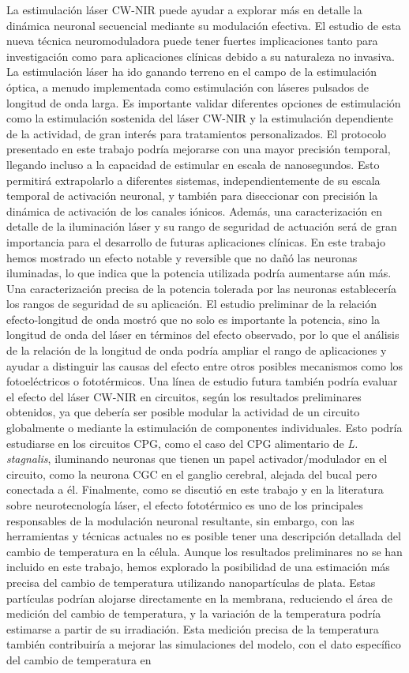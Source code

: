 La estimulación láser CW-NIR puede ayudar a explorar más en detalle la dinámica neuronal secuencial me\-diante su modulación efectiva. El estudio de esta nueva técnica neuromoduladora puede tener fuertes implicaciones tanto para investigación como para aplicaciones clínicas debido a su naturaleza no invasiva. La estimulación láser ha ido ganando terreno en el campo de la estimulación óptica, a menudo implementada como estimulación con láseres pulsados de longitud de onda larga. Es importante validar diferentes opciones de estimulación como la estimulación sostenida del láser CW-NIR y la esti\-mulación dependiente de la actividad, de gran interés para tratamientos personalizados. El protocolo presentado en este trabajo podría mejorarse con una mayor precisión temporal, llegando incluso a la capacidad de estimular en escala de nanosegundos. Esto permitirá extrapolarlo a dife\-rentes sistemas, independientemente de su escala temporal de activación neuronal, y también para di\-seccionar con precisión la dinámica de activación de los canales iónicos. Además, una caracterización en detalle de la iluminación láser y su rango de seguridad de actuación será de gran importancia para el desarrollo de futuras aplicaciones clínicas. En este trabajo hemos mostrado un efecto notable y reversible que no dañó las neuronas iluminadas, lo que indica que la potencia utilizada podría aumentarse aún más. Una caracterización precisa de la potencia tolerada por las neuronas establecería los rangos de seguridad de su aplicación. El estudio preliminar de la relación efecto-longitud de onda mostró que no solo es importante la potencia, sino la longitud de onda del láser en términos del efecto observado, por lo que el análisis de la relación de la longitud de onda podría ampliar el rango de aplicaciones y ayudar a distinguir las causas del efecto entre otros posibles mecanismos como los fotoeléctricos o fototérmicos. Una línea de estudio futura también podría evaluar el efecto del láser CW-NIR en circuitos, según los resultados preliminares obtenidos, ya que debería ser posible modular la actividad de un circuito globalmente o mediante la estimulación de componentes indivi\-duales. Esto podría estudiarse en los circuitos  CPG, como el caso del CPG alimentario de \textit{L. stagnalis}, iluminando neuronas que tienen un papel activador/modulador en el circuito, como la neurona CGC en el ganglio cerebral, alejada del bucal pero conectada a él. Finalmente, como se discutió en este trabajo y en la literatura sobre neurotecnología láser, el efecto fototérmico es uno de los principales responsables de la modulación neuronal resultante, sin embargo, con las herramientas y técnicas actuales no es posible tener una descripción detallada del cambio de temperatura en la célula. Aunque los resultados preliminares no se han incluido en este trabajo, hemos explorado la posibilidad de una estimación más precisa del cambio de temperatura utilizando nanopartículas de plata. Estas partículas podrían alojarse directamente en la membrana, reduciendo el área de medición del cambio de temperatura, y la variación de la temperatura podría estimarse a partir de su irradiación. Esta medición precisa de la temperatura también contribuiría a mejorar las simulaciones del modelo, con el dato específico del cambio de temperatura en 